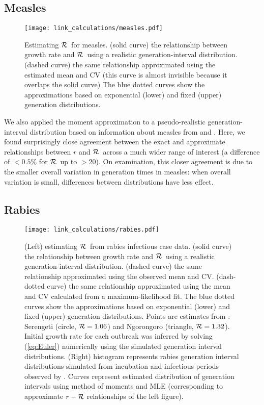 \documentclass[12pt]{article}
\newcommand{\RR}{\ensuremath{{\cal R}}}
\newcommand{\eref}[1]{(\ref{eq:#1})}
\begin{document}
\subsection{Measles}

\begin{figure}[htbp] \centering
	\texttt{[image: link\_calculations/measles.pdf]}
	\caption{Estimating \RR~for measles.
		(solid curve) the relationship between growth rate and \RR~using a realistic generation-interval distribution.
		(dashed curve) the same relationship approximated using the estimated mean and CV (this curve is almost invisible because it overlaps the solid curve)
		The blue dotted curves show the approximations based on exponential (lower) and fixed (upper) generation distributions.
	}
	\label{fig:measlesCurve}
\end{figure}

We also applied the moment approximation to a pseudo-realistic generation-interval distribution based on information about measles from \cite{LessReic09} and \cite{Lloy01}. 
Here, we found surprisingly close agreement between the exact and approximate relationships between $r$ and \RR\ across a much wider range of interest (a difference of $<0.5\%$ for \RR\ up to $>20$).
On examination, this closer agreement is due to the smaller overall variation in generation times in measles: when overall variation is small, differences between distributions have less effect.

\subsection{Rabies}

\begin{figure}[htbp] \centering
	\texttt{[image: link\_calculations/rabies.pdf]}
	\caption{(Left) estimating \RR~from rabies infectious case data.
		(solid curve) the relationship between growth rate and \RR~using a realistic generation-interval distribution.
		(dashed curve) the same relationship approximated using the observed mean and CV.
		(dash-dotted curve) the same relationship approximated using the mean and CV calculated from a maximum-likelihood fit.
		The blue dotted curves show the approximations based on exponential (lower) and fixed (upper) generation distributions.
		Points are estimates from \cite{HampDush09}:
		Serengeti (circle, $\RR=1.06$) and Ngorongoro (triangle, $\RR=1.32$).
		Initial growth rate for each outbreak was inferred by solving \eref{Euler} numerically using the simulated generation interval distributions.
		(Right) histogram represents rabies generation interval distributions simulated from incubation and infectious periods observed by \cite{HampDush09}.
		Curves represent estimated distribution of generation intervals using method of moments and MLE (corresponding to approximate $r-\RR$ relationships of the left figure).
	}
	\label{fig:rabiesCurve}
\end{figure}
\end{document}
